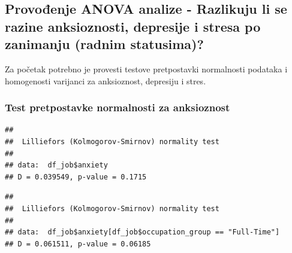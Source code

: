 \documentclass[
]{article}
\newenvironment{Shaded}{\begin{snugshade}}{\end{snugshade}}
\newcommand{\CommentTok}[1]{\textcolor[rgb]{0.56,0.35,0.01}{\textit{#1}}}
\newcommand{\FunctionTok}[1]{\textcolor[rgb]{0.13,0.29,0.53}{\textbf{#1}}}
\newcommand{\NormalTok}[1]{#1}
\newcommand{\SpecialCharTok}[1]{\textcolor[rgb]{0.81,0.36,0.00}{\textbf{#1}}}
\newcommand{\StringTok}[1]{\textcolor[rgb]{0.31,0.60,0.02}{#1}}
\begin{document}
\subsection{Provođenje ANOVA analize - Razlikuju li se razine
anksioznosti, depresije i stresa po zanimanju (radnim
statusima)?}\label{provoux111enje-anova-analize---razlikuju-li-se-razine-anksioznosti-depresije-i-stresa-po-zanimanju-radnim-statusima}

Za početak potrebno je provesti testove pretpostavki normalnosti
podataka i homogenosti varijanci za anksioznost, depresiju i stres.

\subsubsection{Test pretpostavke normalnosti za
anksioznost}\label{test-pretpostavke-normalnosti-za-anksioznost}

\begin{Shaded}
\end{Shaded}

\begin{verbatim}
## 
##  Lilliefors (Kolmogorov-Smirnov) normality test
## 
## data:  df_job$anxiety
## D = 0.039549, p-value = 0.1715
\end{verbatim}

\begin{Shaded}
\end{Shaded}

\begin{verbatim}
## 
##  Lilliefors (Kolmogorov-Smirnov) normality test
## 
## data:  df_job$anxiety[df_job$occupation_group == "Full-Time"]
## D = 0.061511, p-value = 0.06185
\end{verbatim}

\begin{Shaded}
\end{Shaded}
\end{document}
